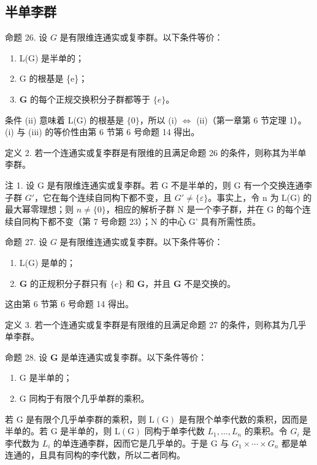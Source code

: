 \subsection{半单李群}

命题 26. 设 \(G\) 是有限维连通实或复李群。以下条件等价：

\begin{enumerate}
\def\labelenumi{(\roman{enumi})}
\item
  L(G) 是半单的；
\item
  G 的根基是 \{e\}；
\item
  \(\mathbf{G}\) 的每个正规交换积分子群都等于 \(\{e\}\)。
\end{enumerate}

条件 (ii) 意味着 L(G) 的根基是 \(\{0\}\)，所以 (i) \(\Leftrightarrow\) (ii)（第一章第 6 节定理 1）。(i) 与 (iii) 的等价性由第 6 节第 6 号命题 14 得出。

定义 2. 若一个连通实或复李群是有限维的且满足命题 26 的条件，则称其为半单李群。

注 1. 设 G 是有限维连通实或复李群。若 G 不是半单的，则 G 有一个交换连通李子群 \(G'\)，它在每个连续自同构下都不变，且 \(G' \neq \{\varepsilon\}\)。事实上，令 n 为 L(G) 的最大幂零理想；则 \(n \neq \{0\}\)，相应的解析子群 N 是一个李子群，并在 G 的每个连续自同构下都不变（第 7 号命题 23）；N 的中心 G' 具有所需性质。

命题 27. 设 \(G\) 是有限维连通实或复李群。以下条件等价：

\begin{enumerate}
\def\labelenumi{(\roman{enumi})}
\item
  L(G) 是单的；
\item
  \(\mathbf{G}\) 的正规积分子群只有 \(\{e\}\) 和 \(\mathbf{G}\)，并且 \(\mathbf{G}\) 不是交换的。
\end{enumerate}

这由第 6 节第 6 号命题 14 得出。

定义 3. 若一个连通实或复李群是有限维的且满足命题 27 的条件，则称其为几乎单李群。

命题 28. 设 \(\mathbf{G}\) 是单连通实或复李群。以下条件等价：

\begin{enumerate}
\def\labelenumi{(\roman{enumi})}
\item
  G 是半单的；
\item
  G 同构于有限个几乎单群的乘积。
\end{enumerate}

若 G 是有限个几乎单李群的乘积，则 \(\mathrm{L}(\mathrm{G})\) 是有限个单李代数的乘积，因而是半单的。若 G 是半单的，则 \(\mathrm{L}(\mathrm{G})\) 同构于单李代数 \(L_{1},\ldots,L_{n}\) 的乘积。令 \(G_{i}\) 是李代数为 \(L_{i}\) 的单连通李群，因而它是几乎单的。于是 G 与 \(G_{1}\times\cdots\times G_{n}\) 都是单连通的，且具有同构的李代数，所以二者同构。

